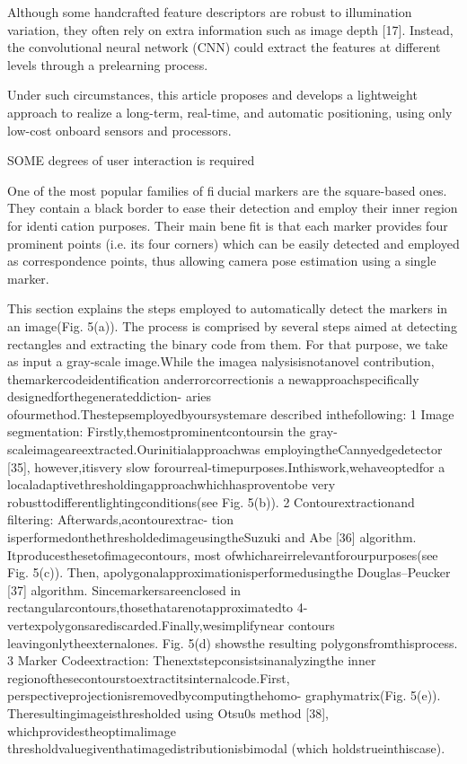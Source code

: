 \documentclass[a4paper]{report}
\begin{document}
Although some handcrafted feature descriptors are robust to illumination variation, they often rely on extra information such as image depth [17]. Instead, the
convolutional neural network (CNN) could extract the features
at different levels through a prelearning process.

Under such circumstances, this article proposes and develops
a lightweight approach to realize a long-term, real-time, and
automatic positioning, using only low-cost onboard sensors and
processors.


SOME degrees of user interaction is required



One of the most popular families of fiducial markers are
the square-based ones. They contain a black border to ease
their detection and employ their inner region for identication
purposes. Their main benefit is that each marker provides
four prominent points (i.e. its four corners) which can
be easily detected and employed as correspondence points,
thus allowing camera pose estimation using a single marker.



This section explains the steps employed to automatically
detect the markers in an image(Fig. 5(a)). The process is
comprised by several steps aimed at detecting rectangles and
extracting the binary code from them. For that purpose, we take as
input a gray-scale image.While the imagea nalysisisnotanovel
contribution, themarkercodeidentification anderrorcorrectionis
a newapproachspecifically designedforthegenerateddiction-
aries ofourmethod.Thestepsemployedbyoursystemare
described inthefollowing:
1 Image segmentation: Firstly,themostprominentcontoursin
the gray-scaleimageareextracted.Ourinitialapproachwas
employingtheCannyedgedetector [35], however,itisvery
slow forourreal-timepurposes.Inthiswork,wehaveoptedfor
a localadaptivethresholdingapproachwhichhasproventobe
very robusttodifferentlightingconditions(see Fig. 5(b)).
2 Contourextractionand filtering: Afterwards,acontourextrac-
tion isperformedonthethresholdedimageusingtheSuzuki
and Abe [36] algorithm. Itproducesthesetofimagecontours,
most ofwhichareirrelevantforourpurposes(see Fig. 5(c)).
Then, apolygonalapproximationisperformedusingthe
Douglas–Peucker [37] algorithm. Sincemarkersareenclosed
in rectangularcontours,thosethatarenotapproximatedto
4-vertexpolygonsarediscarded.Finally,wesimplifynear
contours leavingonlytheexternalones. Fig. 5(d) showsthe
resulting polygonsfromthisprocess.
3 Marker Codeextraction: Thenextstepconsistsinanalyzingthe
inner regionofthesecontourstoextractitsinternalcode.First,
perspectiveprojectionisremovedbycomputingthehomo-
graphymatrix(Fig. 5(e)). Theresultingimageisthresholded
using Otsu0s method [38], whichprovidestheoptimalimage
thresholdvaluegiventhatimagedistributionisbimodal
(which holdstrueinthiscase).
\end{document}
